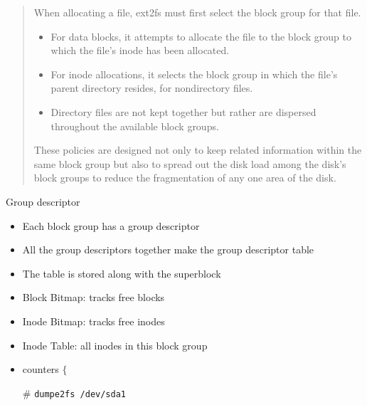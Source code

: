 \begin{quote}
  When allocating a file, ext2fs must first select the block group for that
  file.
  \begin{itemize}
  \item For data blocks, it attempts to allocate the file to the block group to which the
    file's inode has been allocated.
  \item For inode allocations, it selects the block group in which the file's parent
    directory resides, for nondirectory files.
  \item Directory files are not kept together but rather are dispersed throughout the
    available block groups.
  \end{itemize}
  These policies are designed not only to keep related information within the same block
  group but also to spread out the disk load among the disk's block groups to reduce the
  fragmentation of any one area of the disk.
\end{quote}

\begin{frame}
  \begin{block}{Group descriptor}
    \begin{itemize}
    \item Each block group has a group descriptor
    \item All the group descriptors together make the \alert{group descriptor table}
    \item The table is stored along with the superblock
    \item \alert{Block Bitmap:} tracks free blocks
    \item \alert{Inode Bitmap:} tracks free inodes
    \item \alert{Inode Table:} all inodes in this block group
    \item counters $\biggr\{$ 
    \end{itemize}
    \begin{itemize}
    \item[\#] \texttt{dumpe2fs /dev/sda1}
    \end{itemize}    
  \end{block}
\end{frame}

